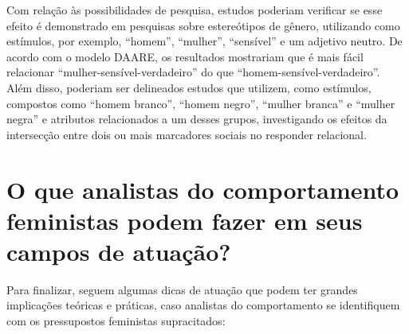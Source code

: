Com relação às possibilidades de pesquisa, estudos poderiam verificar se esse efeito é demonstrado em pesquisas sobre estereótipos de gênero, utilizando como estímulos, por exemplo, ``homem'', ``mulher'', ``sensível'' e um adjetivo neutro. De acordo com o modelo DAARE, os resultados mostrariam que é mais fácil relacionar ``mulher-sensível-verdadeiro'' do que ``homem-sensível-verdadeiro''. Além disso, poderiam ser delineados estudos que utilizem, como estímulos, compostos como ``homem branco'', ``homem negro'', ``mulher branca'' e ``mulher negra'' e atributos relacionados a um desses grupos, investigando os efeitos da intersecção entre dois ou mais marcadores sociais no responder relacional.

\section*{O que analistas do comportamento feministas podem fazer em seus campos de atuação?}

Para finalizar, seguem algumas dicas de atuação que podem ter grandes implicações teóricas e práticas, caso analistas do comportamento se identifiquem com os pressupostos feministas supracitados:

